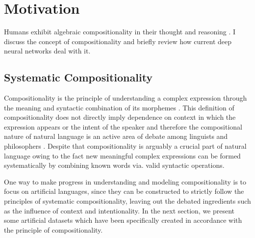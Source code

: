 \section{Motivation} \label{Chapter:motivation}
Humans exhibit algebraic compositionality in their thought and reasoning \citep{marcus2003algebraic}. I discuss the concept of compositionality and briefly review how current deep neural networks deal with it. 


\subsection{Systematic Compositionality} \label{systematic}
Compositionality is the principle of understanding a complex expression through the meaning and syntactic combination of its morphemes \citep{Pelletier1994}. This definition of compositionality does not directly imply dependence on context in which the expression appears or the intent of the speaker and therefore the compositional nature of natural language is an active area of debate among linguists and philosophers \citep{sep-compositionality}. Despite that compositionality is arguably a crucial part of natural language owing to the fact new meaningful complex expressions can be formed systematically by combining known words via. valid syntactic operations.


One way to make progress in understanding and modeling compositionality is to focus on artificial languages, since they can be constructed to strictly follow the principles of systematic compositionality, leaving out the debated ingredients such as the influence of context and intentionality. In the next section, we present some artificial datasets which have been specifically created in accordance with the principle of compositionality.

